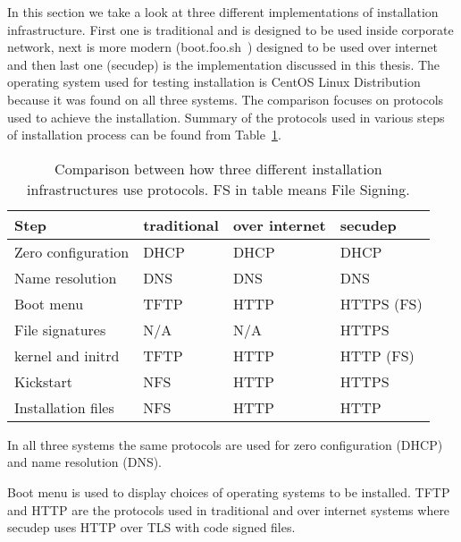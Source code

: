 
In this section we take a look at three different implementations of
installation infrastructure. First one is traditional and is designed
to be used inside corporate network, next is more modern
(boot.foo.sh~\cite{boot-foo-sh}) designed to be used over internet and
then last one (secudep) is the implementation discussed in this
thesis. The operating system used for testing installation is CentOS
Linux Distribution because it was found on all three systems. The
comparison focuses on protocols used to achieve the
installation. Summary of the protocols used in various steps of
installation process can be found from Table~\ref{tab:comparison_table}.

\begin{table}[!ht]
  \def\arraystretch{1.1}%
  \begin{center}
    \label{tab:comparison_table}
    \begin{tabular}{| l | l | l | l |}
      \hline
      Step               & traditional & over internet & secudep    \\
      \hline
      Zero configuration & DHCP        & DHCP          & DHCP       \\
      Name resolution    & DNS         & DNS           & DNS        \\
      Boot menu          & TFTP        & HTTP          & HTTPS (FS) \\
      File signatures    & N/A         & N/A           & HTTPS      \\
      kernel and initrd  & TFTP        & HTTP          & HTTP (FS)  \\
      Kickstart          & NFS         & HTTP          & HTTPS      \\
      Installation files & NFS         & HTTP          & HTTP       \\
      \hline
    \end{tabular}
    \caption{Comparison between how three different installation
      infrastructures use protocols. FS in table means File Signing.}
  \end{center}
\end{table}

In all three systems the same protocols are used for zero
configuration (DHCP) and name resolution (DNS).

Boot menu is used to display choices of operating systems to be
installed. TFTP and HTTP are the protocols used in traditional and
over internet systems where secudep uses HTTP over TLS with code
signed files.

